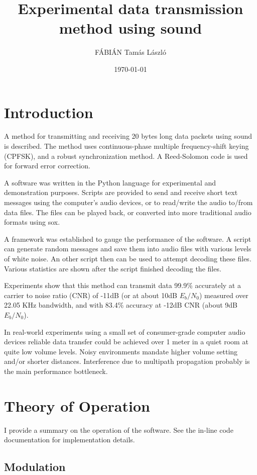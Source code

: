 \documentclass[a4paper]{article}
\title{Experimental data transmission method using sound}
\author{FÁBIÁN Tamás László}
\date{\today}
\begin{document}
\maketitle

\section{Introduction}

A method for transmitting and receiving 20 bytes long data packets 
using sound is described. The method uses continuous-phase multiple frequency-shift keying (CPFSK), and a robust synchronization method. A Reed-Solomon code is used for forward error correction.

A software was written in the Python language for experimental and 
demonstration purposes. Scripts are provided to send and receive short 
text messages using the computer's audio devices, or to read/write the 
audio to/from data files. The files can be played back, or converted 
into more traditional audio formats using sox\cite{sox1}.

A framework was established to gauge the performance of the software. A 
script can generate random messages and save them into audio files with 
various levels of white noise. An other script then can be used to 
attempt decoding these files. Various statistics are shown after the 
script finished decoding the files.

Experiments show that this method can transmit data 99.9\% accurately 
at a carrier to noise ratio (CNR) of -11dB (or at about 10dB 
$E_b/N_0$) measured over 22.05 KHz bandwidth, and with 83.4\% accuracy 
at -12dB CNR (about 9dB $E_b/N_0$).

In real-world experiments using a small set of consumer-grade computer 
audio devices reliable data transfer could be achieved over 1 meter 
in a quiet room at quite low volume levels. Noisy environments mandate 
higher volume setting and/or shorter distances. Interference due to 
multipath propagation probably is the main performance bottleneck.

\section{Theory of Operation}

I provide a summary on the operation of the software. See the in-line
code documentation for implementation details.

\subsection{Modulation}
\end{document}
